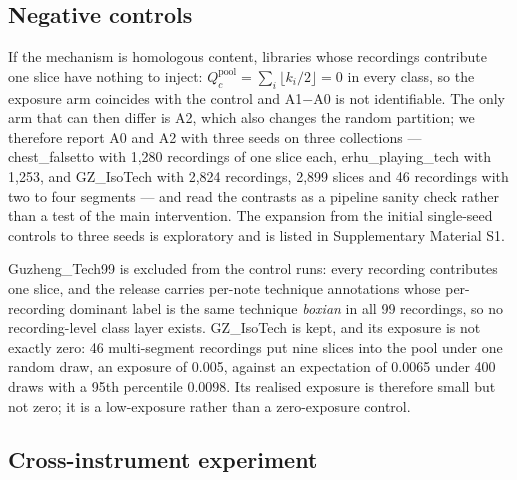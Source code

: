 \subsection{Negative controls}

If the mechanism is homologous content, libraries whose recordings contribute one slice have
nothing to inject: $Q^{\text{pool}}_c = \sum_i \lfloor k_i/2 \rfloor = 0$ in every class, so the
exposure arm coincides with the control and A1$-$A0 is not identifiable. The only arm that can
then differ is A2, which also changes the random partition; we therefore report A0 and A2 with three
seeds on three collections --- chest\_falsetto with 1{,}280 recordings of one slice each,
erhu\_playing\_tech with 1{,}253, and GZ\_IsoTech with 2{,}824 recordings, 2{,}899 slices and 46 recordings
with two to four segments --- and read the contrasts as a pipeline sanity check rather than a test of the main intervention.
The expansion from the initial single-seed controls to three seeds is exploratory and is
listed in Supplementary Material S1.

Guzheng\_Tech99 is excluded from the control runs: every recording contributes one slice, and
the release carries per-note technique annotations whose per-recording dominant label is the same
technique \emph{boxian} in all 99 recordings, so no recording-level class layer exists. GZ\_IsoTech
is kept, and its exposure is not exactly zero: 46 multi-segment recordings put nine slices into
the pool under one random draw, an exposure of 0.005, against an expectation of 0.0065 under 400 draws with a 95th
percentile 0.0098. Its realised exposure is therefore small but not zero; it is a low-exposure rather than a
zero-exposure control.

\subsection{Cross-instrument experiment}
\label{sec:crossinstrument}

